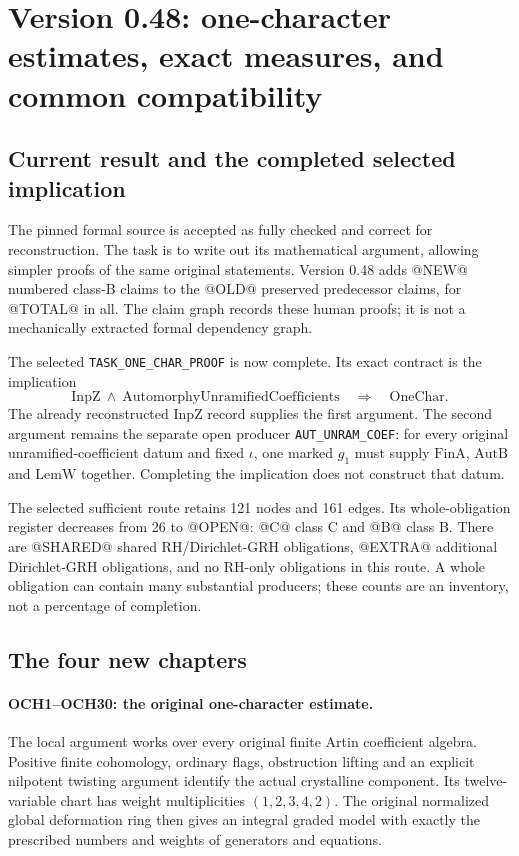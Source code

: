 \section{Version 0.48: one-character estimates, exact measures, and common compatibility}
\label{sec:dependency-audit-v48}

\subsection{Current result and the completed selected implication}

The pinned formal source is accepted as fully checked and correct for
reconstruction. The task is to write out its mathematical argument,
allowing simpler proofs of the same original statements. Version 0.48
adds @NEW@ numbered class-B claims to the @OLD@ preserved predecessor
claims, for @TOTAL@ in all. The claim graph records these human proofs;
it is not a mechanically extracted formal dependency graph.

The selected \texttt{TASK\_ONE\_CHAR\_PROOF} is now complete.
Its exact contract is the implication
\[
 \mathrm{InpZ}\ \wedge\
 \mathrm{AutomorphyUnramifiedCoefficients}
 \quad\Longrightarrow\quad\mathrm{OneChar}.
\]
The already reconstructed \(\mathrm{InpZ}\) record supplies the first
argument. The second argument remains the separate open producer
\texttt{AUT\_UNRAM\_COEF}: for every original unramified-coefficient
datum and fixed \(\iota\), one marked \(g_1\) must supply
\(\mathrm{FinA}\), \(\mathrm{AutB}\) and \(\mathrm{LemW}\)
together. Completing the implication does not construct that datum.

The selected sufficient route retains 121 nodes and 161 edges.
Its whole-obligation register decreases from 26 to @OPEN@:
@C@ class C and @B@ class B. There are @SHARED@ shared RH/Dirichlet-GRH
obligations, @EXTRA@ additional Dirichlet-GRH obligations, and no
RH-only obligations in this route. A whole obligation can contain
many substantial producers; these counts are an inventory, not a
percentage of completion.

\subsection{The four new chapters}

\paragraph{OCH1--OCH30: the original one-character estimate.}
The local argument works over every original finite Artin coefficient
algebra. Positive finite cohomology, ordinary flags, obstruction
lifting and an explicit nilpotent twisting argument identify the
actual crystalline component. Its twelve-variable chart has weight
multiplicities \((1,2,3,4,2)\). The original normalized global
deformation ring then gives an integral graded model with exactly
the prescribed numbers and weights of generators and equations.

